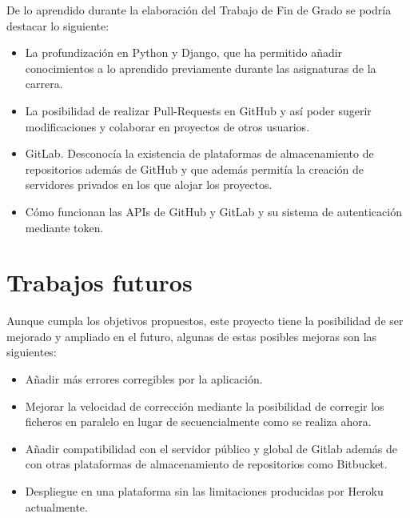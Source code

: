 \documentclass[a4paper, 12pt]{book}
\begin{document}
De lo aprendido durante la elaboración del Trabajo de Fin de Grado se podría destacar lo siguiente:

\begin{itemize}
  \item La profundización en Python y Django, que ha permitido añadir conocimientos a lo aprendido previamente durante las asignaturas de la carrera.
  \item La posibilidad de realizar Pull-Requests en GitHub y así poder sugerir modificaciones y colaborar en proyectos de otros usuarios.
  \item GitLab. Desconocía la existencia de plataformas de almacenamiento de repositorios además de GitHub y que además permitía la creación de servidores privados en los que alojar los proyectos.
  \item Cómo funcionan las APIs de GitHub y GitLab y su sistema de autenticación mediante token.
\end{itemize}

\section{Trabajos futuros}
\label{sec:trabajos_futuros}

Aunque cumpla los objetivos propuestos, este proyecto tiene la posibilidad de ser mejorado y ampliado en el futuro, algunas de estas posibles mejoras son las siguientes:

\begin{itemize}
  \item Añadir más errores corregibles por la aplicación. 
  \item Mejorar la velocidad de corrección mediante la posibilidad de corregir los ficheros en paralelo en lugar de secuencialmente como se realiza ahora.
  \item Añadir compatibilidad con el servidor público y global de Gitlab además de con otras plataformas de almacenamiento de repositorios como Bitbucket.
  \item Despliegue en una plataforma sin las limitaciones producidas por Heroku actualmente.
\end{itemize}


\cleardoublepage
\appendix
\end{document}
